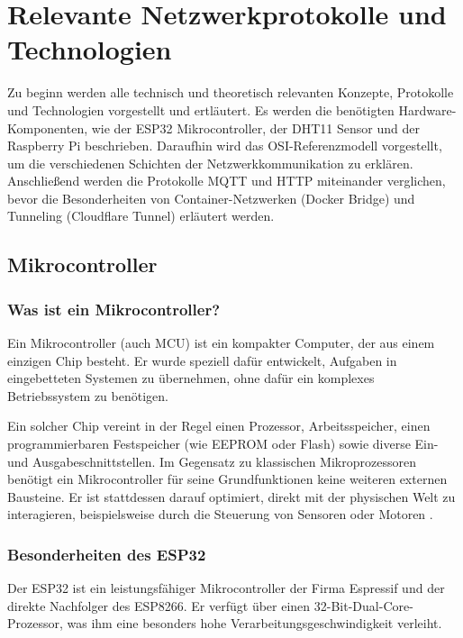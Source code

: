 
\chapter{Relevante Netzwerkprotokolle und Technologien}

Zu beginn werden alle technisch und theoretisch relevanten Konzepte, Protokolle und Technologien vorgestellt und ertläutert. Es werden die benötigten Hardware-Komponenten, wie der ESP32 Mikrocontroller, der DHT11 Sensor und der Raspberry Pi beschrieben. Daraufhin wird das OSI-Referenzmodell vorgestellt, um die verschiedenen Schichten der Netzwerkkommunikation zu erklären. Anschließend werden die Protokolle MQTT und HTTP miteinander verglichen, bevor die Besonderheiten von Container-Netzwerken (Docker Bridge) und Tunneling (Cloudflare Tunnel) erläutert werden.

\section{Mikrocontroller}

\subsection{Was ist ein Mikrocontroller?}
Ein Mikrocontroller (auch \ac{MCU}) ist ein kompakter Computer, der aus einem einzigen Chip besteht. Er wurde speziell dafür entwickelt, Aufgaben in eingebetteten Systemen zu übernehmen, ohne dafür ein komplexes Betriebssystem zu benötigen.

Ein solcher Chip vereint in der Regel einen Prozessor, Arbeitsspeicher, einen programmierbaren Festspeicher (wie \ac{EEPROM} oder Flash) sowie diverse Ein- und Ausgabeschnittstellen. Im Gegensatz zu klassischen Mikroprozessoren benötigt ein Mikrocontroller für seine Grundfunktionen keine weiteren externen Bausteine. Er ist stattdessen darauf optimiert, direkt mit der physischen Welt zu interagieren, beispielsweise durch die Steuerung von Sensoren oder Motoren .

\subsection{Besonderheiten des ESP32}
Der ESP32 ist ein leistungsfähiger Mikrocontroller der Firma Espressif und der direkte Nachfolger des ESP8266. Er verfügt über einen 32-Bit-Dual-Core-Prozessor, was ihm eine besonders hohe Verarbeitungsgeschwindigkeit verleiht.

